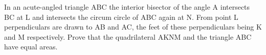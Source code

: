 \item In an acute-angled triangle ABC the interior bisector of the angle A intersects BC at L and intersects the circum circle of ABC again at N. From point L perpendiculars are drawn to AB and AC, the feet of these perpendiculars being K and M respectively. Prove that the quadrilateral AKNM and the triangle ABC have equal areas.




















